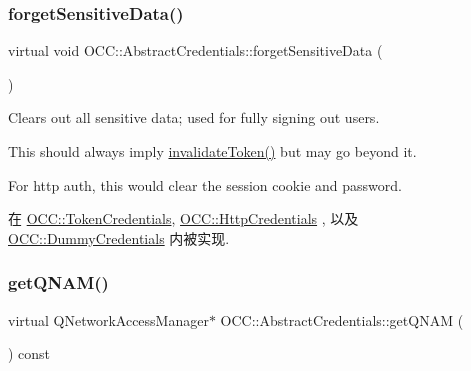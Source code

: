 \mbox{\label{class_o_c_c_1_1_abstract_credentials_af8f5afe21813bd54607713342fef8448}} 
\subsubsection{\texorpdfstring{forget\+Sensitive\+Data()}{forgetSensitiveData()}}
{\footnotesize\ttfamily virtual void O\+C\+C\+::\+Abstract\+Credentials\+::forget\+Sensitive\+Data (\begin{DoxyParamCaption}{ }\end{DoxyParamCaption})\hspace{0.3cm}{\ttfamily [pure virtual]}}

Clears out all sensitive data; used for fully signing out users.

This should always imply \hyperlink{class_o_c_c_1_1_abstract_credentials_a9c5d9d0c3e4a8fc1ff8cf45efc2f0337}{invalidate\+Token()} but may go beyond it.

For http auth, this would clear the session cookie and password. 

在 \hyperlink{class_o_c_c_1_1_token_credentials_a5775fc2e216e7e26cf5f1adc764641d7}{O\+C\+C\+::\+Token\+Credentials}, \hyperlink{class_o_c_c_1_1_http_credentials_a332002f8a742266ab26f7bc5eb1d4737}{O\+C\+C\+::\+Http\+Credentials} , 以及 \hyperlink{class_o_c_c_1_1_dummy_credentials_abbe85cf8654a6828a8a86639c40b1d72}{O\+C\+C\+::\+Dummy\+Credentials} 内被实现.

\mbox{\label{class_o_c_c_1_1_abstract_credentials_ae5b9fd23e37129efede9b4d430ac5766}} 
\subsubsection{\texorpdfstring{get\+Q\+N\+A\+M()}{getQNAM()}}
{\footnotesize\ttfamily virtual Q\+Network\+Access\+Manager$\ast$ O\+C\+C\+::\+Abstract\+Credentials\+::get\+Q\+N\+AM (\begin{DoxyParamCaption}{ }\end{DoxyParamCaption}) const\hspace{0.3cm}{\ttfamily [pure virtual]}}



